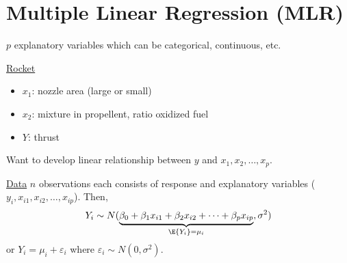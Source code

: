 \section{Multiple Linear Regression (MLR)}
$ p $ explanatory variables which can be categorical,
continuous, etc.

\underline{Rocket}
\begin{itemize}
    \item $ x_1 $: nozzle area (large or small)
    \item $ x_2 $: mixture in propellent, ratio oxidized fuel
    \item $ Y $: thrust
\end{itemize}
Want to develop linear relationship between $ y $
and $ x_1,x_2,\ldots,x_p $.

\underline{Data}
$ n $ observations each consists of
response and explanatory variables ($ y_i , x_{i1},x_{i2},\ldots,x_{ip} $).
Then,
\[ Y_i \sim N(
    \underbrace{\beta_0+\beta_1x_{i1}+
        \beta_2x_{i2}+\cdots +\beta_p x_{ip}}_{\E{Y_i}=
        \mu_i},\sigma^2) \]
or $ Y_i=\mu_i+\varepsilon_i $ where $ \varepsilon_i \sim N(0,\sigma^2) $.

